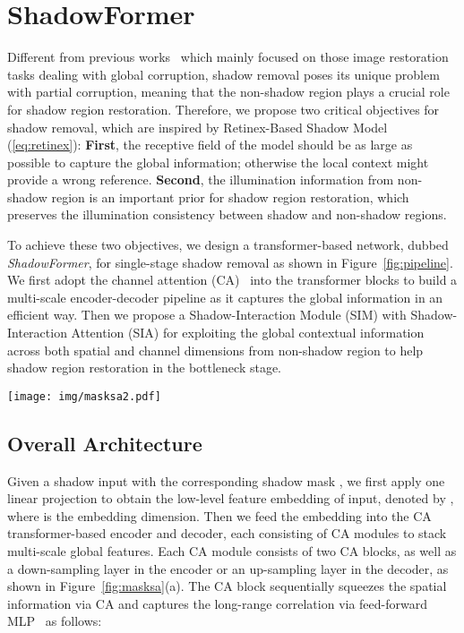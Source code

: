 \documentclass[letterpaper]{article} \usepackage{aaai23}  \usepackage{times}  \usepackage{helvet}  \usepackage{courier}  \usepackage[hyphens]{url}  \usepackage{graphicx} \urlstyle{rm} \def\UrlFont{\rm}  \usepackage{natbib}  \usepackage{caption} \frenchspacing  \setlength{\pdfpagewidth}{8.5in} \setlength{\pdfpageheight}{11in} \usepackage{algorithm}
\begin{document}
\section{ShadowFormer}
Different from previous works~\cite{liang2021swinir,wang2021uformer} which mainly focused on those image restoration tasks dealing with global corruption, shadow removal poses its unique problem with partial corruption, meaning that the non-shadow region plays a crucial role for shadow region restoration.
Therefore, we propose two critical objectives for shadow removal, which are inspired by Retinex-Based Shadow Model (\ref{eq:retinex}): \textbf{First}, the receptive field of the model should be as large as possible to capture the global information; otherwise the local context might provide a wrong reference.
\textbf{Second}, the illumination information from non-shadow region is an important prior for shadow region restoration, which preserves the illumination consistency between shadow and non-shadow regions.




To achieve these two objectives, we design a transformer-based network, dubbed \textit{ShadowFormer}, for single-stage shadow removal as shown in Figure~\ref{fig:pipeline}.
We first adopt the channel attention (CA)~\cite{hu2018squeeze} into the transformer blocks to build a multi-scale encoder-decoder pipeline as it captures the global information in an efficient way.
Then we propose a Shadow-Interaction Module (SIM) with Shadow-Interaction Attention (SIA) for exploiting the global contextual information across both spatial and channel dimensions from non-shadow region to help shadow region restoration in the bottleneck stage.

\begin{figure*}[!t]
\centering
\texttt{[image: img/masksa2.pdf]} 
\vspace{-0.2cm}
\caption{The detailed architectures of ShadowFormer model components. (a) Channel Attention (CA) Module in the encoder and decoder. (b) Shadow-Interaction Module (SIM), as well as an illustration of Shadow-Interaction Attention (SIA). Reweighting the attention map by the correlation map between shadow and non-shadow patches to emphasize the contextual correlation between shadow and non-shadow regions.}
\label{fig:masksa} 
\end{figure*}

\subsection{Overall Architecture}
Given a shadow input  with the corresponding shadow mask , we first apply one linear projection  to obtain the low-level feature embedding of input, denoted by , where  is the embedding dimension.
Then we feed the embedding  into the CA transformer-based encoder and decoder, each consisting of  CA modules to stack multi-scale global features. 
Each CA module consists of two CA blocks, as well as a down-sampling layer in the encoder or an up-sampling layer in the decoder, as shown in Figure~\ref{fig:masksa}(a).
The CA block sequentially squeezes the spatial information via CA and captures the long-range correlation via feed-forward MLP~\cite{dosovitskiy2010image} as follows:
\end{document}
